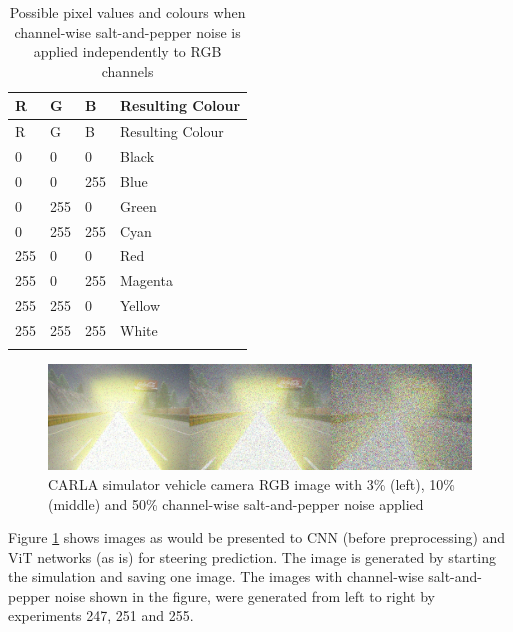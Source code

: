 \begin{longtable}{@{}llll@{}}
\toprule
R & G & B & Resulting Colour \\
\midrule
\endfirsthead
\toprule
R & G & B & Resulting Colour \\
\midrule
\endhead
0 & 0 & 0 & Black \\
0 & 0 & 255 & Blue \\
0 & 255 & 0 & Green \\
0 & 255 & 255 & Cyan \\
255 & 0 & 0 & Red \\
255 & 0 & 255 & Magenta \\
255 & 255 & 0 & Yellow \\
255 & 255 & 255 & White \\
\bottomrule
\caption{Possible pixel values and colours when channel-wise salt-and-pepper noise is applied independently to RGB channels}
\label{tab:channel_wise_salt_pepper_colors}
\end{longtable}





\begin{figure}[H]
    \centering
    \includegraphics[width=1.0\linewidth]{Figures/Results/experiment-247-251-255-3pc-10pc-50pc-rbg-pepper-noise-combined.jpg}
    \caption{CARLA simulator vehicle camera RGB image with 3\% (left), 10\% (middle) and 50\% channel-wise salt-and-pepper noise applied}
    \label{fig:experiment-247-251-255-3pc-10pc-50pc-rbg-pepper-noise-combined}
\end{figure}

Figure \ref{fig:experiment-247-251-255-3pc-10pc-50pc-rbg-pepper-noise-combined} shows images as would be presented to CNN (before preprocessing) and ViT networks (as is) for steering prediction. The image is generated by starting the simulation and saving one image. The images with channel-wise salt-and-pepper noise shown in the figure, were generated from left to right by experiments 247, 251 and 255.


